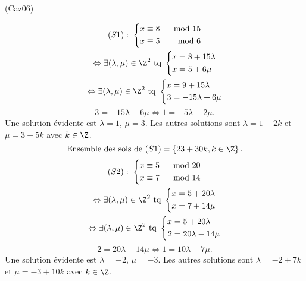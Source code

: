 \begin{tiny}(Caz06)\end{tiny}
\begin{multline*}
  (S1): \;\left\lbrace
  \begin{aligned}
    x &\equiv 8 &\mod 15 \\
    x &\equiv 5 &\mod 6
  \end{aligned}
  \right.\\
\Leftrightarrow
\exists (\lambda, \mu) \in \Z^2 \text{ tq }
  \left\lbrace
  \begin{aligned}
    x &= 8 + 15 \lambda  \\
    x &= 5 + 6\mu
  \end{aligned}
\right.\\
\Leftrightarrow
\exists (\lambda, \mu) \in \Z^2 \text{ tq }
  \left\lbrace
  \begin{aligned}
    x &= 9 + 15 \lambda  \\
    3 &= -15 \lambda + 6\mu
  \end{aligned}
\right.
\end{multline*}
\[
  3 = -15 \lambda + 6 \mu \Leftrightarrow 1 = - 5\lambda + 2\mu.
\]
Une solution évidente est $\lambda = 1$, $\mu = 3$. Les autres solutions sont $\lambda = 1+2k$ et $\mu = 3 + 5k$ avec $k\in \Z$.
\[
\text{Ensemble des sols de }(S1) =  \left\lbrace 23 + 30k, k\in \Z \right\rbrace.
\]
\begin{multline*}
  (S2): \;\left\lbrace
  \begin{aligned}
    x &\equiv 5 &\mod 20 \\
    x &\equiv 7 &\mod 14
  \end{aligned}
  \right.\\
\Leftrightarrow
\exists (\lambda, \mu) \in \Z^2 \text{ tq }
  \left\lbrace
  \begin{aligned}
    x &= 5 + 20 \lambda  \\
    x &= 7 + 14\mu
  \end{aligned}
\right.\\
\Leftrightarrow
\exists (\lambda, \mu) \in \Z^2 \text{ tq }
  \left\lbrace
  \begin{aligned}
    x &= 5 + 20 \lambda  \\
    2 &= 20 \lambda - 14\mu
  \end{aligned}
\right.
\end{multline*}
\[
  2 = 20 \lambda - 14 \mu \Leftrightarrow 1 = 10\lambda - 7\mu.
\]
Une solution évidente est $\lambda = -2$, $\mu = -3$. Les autres solutions sont $\lambda = -2 + 7k$ et $\mu = -3 + 10k$ avec $k\in \Z$.
